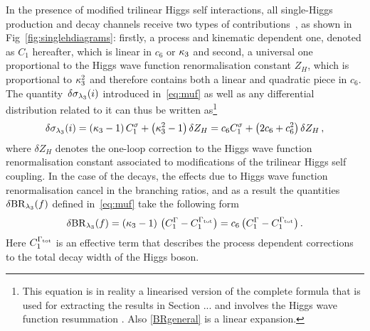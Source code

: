 In the presence of modified trilinear Higgs self interactions, all single-Higgs production and decay channels receive two types of contributions~\cite{Gorbahn:2016uoy,Degrassi:2016wml}, as shown in Fig~\ref{fig:singlehdiagrams}: firstly, a process and kinematic dependent one, denoted as $C_1$ hereafter, which is linear in $c_6$ or $\kappa_{3}$ and second, a universal one proportional to the Higgs wave function renormalisation constant $Z_H$, which is proportional to $\kappa_{3}^2$ and therefore contains both a linear and quadratic piece  in $c_6$. The quantity~$\delta \sigma_{\lambda_{3}}(i)$ introduced in~\eqref{eq:muf} as well as any differential distribution related to it can thus be written as\footnote{This equation is in reality a linearised version of the complete formula that is used for extracting the results in Section ... and involves the Higgs wave function resummation \cite{Degrassi:2016wml,Maltoni:2017ims}. Also \eqref{BRgeneral} is a linear expansion. } 
\begin{equation} \label{dsigmakt}
\delta \sigma_{\lambda_{3}}(i)  = \left ( \kappa_3 - 1\right ) C_1^{\sigma}  + \left ( \kappa_3^2 - 1\right ) \delta Z_H = c_6 C_1^{\sigma} +  \left ( 2 c_6 + c_6^2 \right )  \delta Z_H \,, 
\end{equation}
where $\delta Z_H$ denotes the one-loop correction to the Higgs wave function renormalisation constant associated to modifications of the trilinear Higgs self coupling. In the case of the decays, the effects due to  Higgs wave function renormalisation cancel in the branching ratios, and as a result the quantities $\delta {\rm BR}_{\lambda_{3}} (f)$ defined in~\eqref{eq:muf} take the following form 
\begin{equation}
\delta {\rm BR}_{\lambda_{3}}(f)  =   \left ( \kappa_3 - 1\right )  \, \big (C_1^{\Gamma}-C_1^{\Gamma_{\rm tot}} \big ) = c_6 \, \big (C_1^{\Gamma}-C_1^{\Gamma_{\rm tot}} \big )  \,.
\label{BRgeneral} 
\end{equation}
Here $C_1^{\Gamma_{\rm tot}}$ is an effective term that describes the process dependent  corrections to the total decay width of the Higgs boson. 

